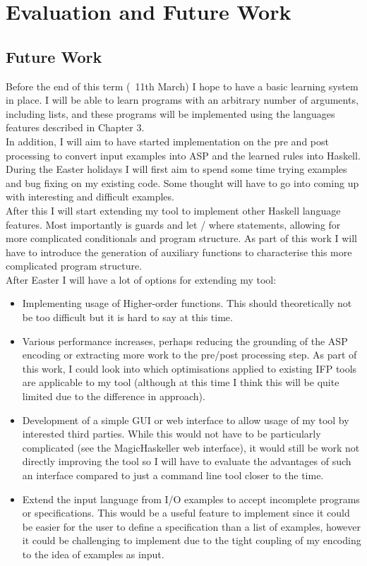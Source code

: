 \chapter{Evaluation and Future Work}

\section{Future Work}

Before the end of this term (~11th March) I hope to have a basic learning system in place. I will be able to learn programs with an arbitrary number of arguments, including lists, and these programs will be implemented using the languages features described in Chapter 3.  \\
In addition, I will aim to have started implementation on the pre and post processing to convert input examples into ASP and the learned rules into Haskell. \\

During the Easter holidays I will first aim to spend some time trying examples and bug fixing on my existing code. Some thought will have to go into coming up with interesting and difficult examples. \\

After this I will start extending my tool to implement other Haskell language features. Most importantly is guards and let / where statements, allowing for more complicated conditionals and program structure. As part of this work I will have to introduce the generation of auxiliary functions to characterise this more complicated program structure. \\

After Easter I will have a lot of options for extending my tool:

\begin{itemize}
\item Implementing usage of Higher-order functions. This should theoretically not be too difficult but it is hard to say at this time.
\item Various performance increases, perhaps reducing the grounding of the ASP encoding or extracting more work to the pre/post processing step. As part of this work, I could look into which optimisations applied to existing IFP tools are applicable to my tool (although at this time I think this will be quite limited due to the difference in approach).
\item Development of a simple GUI or web interface to allow usage of my tool by interested third parties. While this would not have to be particularly complicated (see the MagicHaskeller web interface), it would still be work not directly improving the tool so I will have to evaluate the advantages of such an interface compared to just a command line tool closer to the time.
\item Extend the input language from I/O examples to accept incomplete programs or specifications. This would be a useful feature to implement since it could be easier for the user to define a specification than a list of examples, however it could be challenging to implement due to the tight coupling of my encoding to the idea of examples as input.
\end{itemize}

